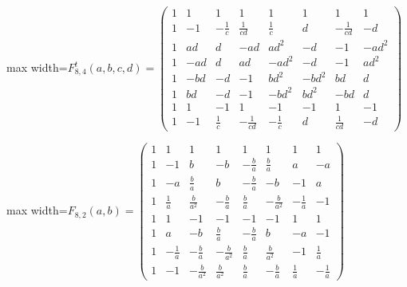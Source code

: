 \documentclass[11pt]{amsart}
\begin{document}
\begin{center}\normalsize\setlength{\arraycolsep}{3.8pt}
\begin{adjustbox}{max width=\textwidth}$\displaystyle F_{8,4}^{t}(a,b,c,d)=\begin{pmatrix}
1 & 1 & 1 & 1 & 1 & 1 & 1 & 1 \\
1 & -1 & -\frac{1}{c} & \frac{1}{cd} & \frac{1}{c} & d & -\frac{1}{cd} & -d \\
1 & ad & d & -ad & ad^{2} & -d & -1 & -ad^{2} \\
1 & -ad & d & ad & -ad^{2} & -d & -1 & ad^{2} \\
1 & -bd & -d & -1 & bd^{2} & -bd^{2} & bd & d \\
1 & bd & -d & -1 & -bd^{2} & bd^{2} & -bd & d \\
1 & 1 & -1 & 1 & -1 & -1 & 1 & -1 \\
1 & -1 & \frac{1}{c} & -\frac{1}{cd} & -\frac{1}{c} & d & \frac{1}{cd} & -d
\end{pmatrix}$\end{adjustbox}
\end{center}

\begin{center}\normalsize\setlength{\arraycolsep}{3.8pt}
\begin{adjustbox}{max width=\textwidth}$\displaystyle F_{8,2}(a,b)=\begin{pmatrix}
1 & 1 & 1 & 1 & 1 & 1 & 1 & 1 \\
1 & -1 & b & -b & -\frac{b}{a} & \frac{b}{a} & a & -a \\
1 & -a & \frac{b}{a} & b & -\frac{b}{a} & -b & -1 & a \\
1 & \frac{1}{a} & \frac{b}{a^{2}} & -\frac{b}{a} & \frac{b}{a} & -\frac{b}{a^{2}} & -\frac{1}{a} & -1 \\
1 & 1 & -1 & -1 & -1 & -1 & 1 & 1 \\
1 & a & -b & \frac{b}{a} & -\frac{b}{a} & b & -a & -1 \\
1 & -\frac{1}{a} & -\frac{b}{a} & -\frac{b}{a^{2}} & \frac{b}{a} & \frac{b}{a^{2}} & -1 & \frac{1}{a} \\
1 & -1 & -\frac{b}{a^{2}} & \frac{b}{a^{2}} & \frac{b}{a} & -\frac{b}{a} & \frac{1}{a} & -\frac{1}{a}
\end{pmatrix}$\end{adjustbox}
\end{center}
\end{document}
